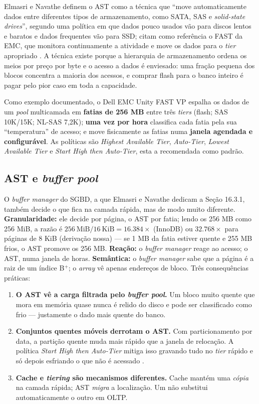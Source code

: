\documentclass[11pt,a4paper]{article}
\begin{document}
Elmasri e Navathe definem o AST como a técnica que ``move automaticamente dados entre diferentes tipos de
armazenamento, como SATA, SAS e \textit{solid-state drives}'', segundo uma política em que dados pouco
usados vão para discos lentos e baratos e dados frequentes vão para SSD; citam como referência o FAST da
EMC, que monitora continuamente a atividade e move os dados para o \textit{tier} apropriado
\cite{elmasri2018}. A técnica existe porque a hierarquia de armazenamento ordena os meios por preço por
byte e o acesso a dados é enviesado: uma fração pequena dos blocos concentra a maioria dos acessos, e
comprar flash para o banco inteiro é pagar pelo pior caso em toda a capacidade.

Como exemplo documentado, o Dell EMC Unity FAST VP \cite{dellfast} espalha os dados de um \textit{pool}
multicamada em \textbf{fatias de 256 MB} entre três \textit{tiers} (flash; SAS 10K/15K; NL-SAS 7,2K);
\textbf{uma vez por hora} classifica cada fatia pela sua ``temperatura'' de acesso; e move fisicamente as
fatias numa \textbf{janela agendada e configurável}. As políticas são \textit{Highest Available Tier},
\textit{Auto-Tier}, \textit{Lowest Available Tier} e \textit{Start High then Auto-Tier}, esta a recomendada
como padrão.

\subsection{AST e \textit{buffer pool}}
\label{sec:asttensao}

O \textit{buffer manager} do SGBD, a que Elmasri e Navathe dedicam a Seção 16.3.1, também decide o que
fica na camada rápida, mas de modo muito diferente. \textbf{Granularidade:} ele decide por página, o AST
por fatia; lendo os 256 MB como 256 MiB, a razão é $256\ \text{MiB} / 16\ \text{KiB} = 16.384\times$
(InnoDB) ou $32.768\times$ para páginas de 8 KiB (derivação nossa) --- se 1 MB da fatia estiver quente e
255 MB frios, o AST promove os 256 MB. \textbf{Reação:} o \textit{buffer manager} reage ao acesso; o AST,
numa janela de horas. \textbf{Semântica:} o \textit{buffer manager} sabe que a página é a raiz de um
índice B$^+$; o \textit{array} vê apenas endereços de bloco. Três consequências práticas:

\begin{enumerate}[leftmargin=0.7cm,itemsep=1pt]
\item \textbf{O AST vê a carga filtrada pelo \textit{buffer pool}.} Um bloco muito quente que mora em
memória quase nunca é relido do disco e pode ser classificado como frio --- justamente o dado mais quente
do banco.
\item \textbf{Conjuntos quentes móveis derrotam o AST.} Com particionamento por data, a partição quente
muda mais rápido que a janela de relocação. A política \textit{Start High then Auto-Tier} mitiga isso
gravando tudo no \textit{tier} rápido e só depois esfriando o que não é acessado \cite{dellfast}.
\item \textbf{Cache e \textit{tiering} são mecanismos diferentes.} Cache mantém uma \emph{cópia} na camada
rápida; AST \emph{migra} a localização. Um não substitui automaticamente o outro em OLTP.
\end{enumerate}
\end{document}
